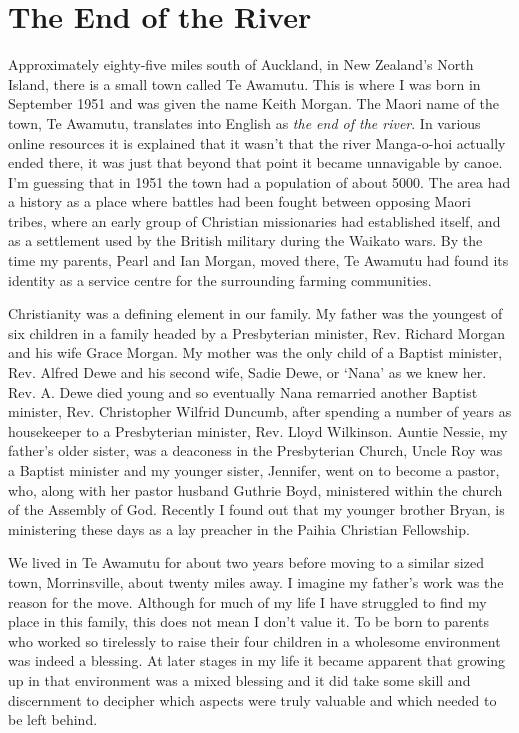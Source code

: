 \chapter{The End of the River}

Approximately eighty-five miles south of Auckland, in New Zealand's North
Island, there is a small town called Te Awamutu. This is where I was
born in September 1951 and was given the name Keith Morgan. The Maori
name of the town, Te Awamutu, translates into English as \emph{the end
  of the river}. In various online resources\cite{early-history}
it is explained that it wasn't that the river
Manga-o-hoi actually ended there, it was just that beyond that point it
became unnavigable by canoe. I'm guessing that in 1951 the town had a
population of about 5000. The area had a history as a place where
battles had been fought between opposing Maori tribes, where an early
group of Christian missionaries had established itself, and as a
settlement used by the British military during the Waikato wars. By the
time my parents, Pearl and Ian Morgan, moved there, Te Awamutu had found
its identity as a service centre for the surrounding farming
communities.

Christianity was a defining element in our family. My father was the
youngest of six children in a family headed by a Presbyterian minister,
Rev. Richard Morgan and his wife Grace Morgan. My mother was the only
child of a Baptist minister, Rev. Alfred Dewe and his second wife, Sadie
Dewe, or `Nana' as we knew her. Rev. A. Dewe died young and so eventually
Nana remarried another Baptist minister, Rev. Christopher Wilfrid
Duncumb, after spending a number of years as housekeeper to a
Presbyterian minister, Rev. Lloyd Wilkinson. Auntie Nessie, my father's
older sister, was a deaconess in the Presbyterian Church, Uncle Roy was a Baptist
minister and my younger sister, Jennifer, went on to become a pastor,
who, along with her pastor husband Guthrie Boyd, ministered within the
church of the Assembly of God. Recently I found out that my younger
brother Bryan, is ministering these days as a lay preacher in the Paihia
Christian Fellowship.

We lived in Te Awamutu for about two years before moving to a similar
sized town, Morrinsville, about twenty miles away. I imagine my father's
work was the reason for the move. Although for much of my life I have
struggled to find my place in this family, this does not mean I don't
value it. To be born to parents who worked so tirelessly to raise their
four children in a wholesome environment was indeed a blessing. At later
stages in my life it became apparent that growing up in that environment
was a mixed blessing and it did take some skill and discernment to
decipher which aspects were truly valuable and which needed to be left
behind.

